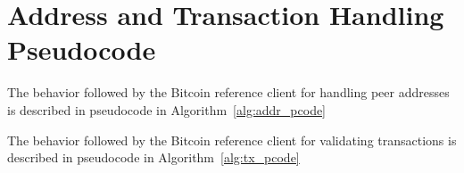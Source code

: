 
\section{Address and Transaction Handling Pseudocode}

The behavior followed by the Bitcoin reference client for handling peer addresses is described in pseudocode in Algorithm~\ref{alg:addr_pcode}


The behavior followed by the Bitcoin reference client for validating transactions is described in pseudocode in Algorithm~\ref{alg:tx_pcode}

